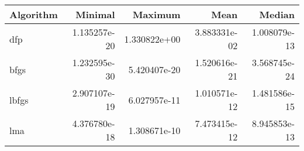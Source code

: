 \begin{tabular}{lrrrr}
\toprule
Algorithm &      Minimal &      Maximum &         Mean &       Median \\
\midrule
      dfp & 1.135257e-20 & 1.330822e+00 & 3.883331e-02 & 1.008079e-13 \\
     bfgs & 1.232595e-30 & 5.420407e-20 & 1.520616e-21 & 3.568745e-24 \\
    lbfgs & 2.907107e-19 & 6.027957e-11 & 1.010571e-12 & 1.481586e-15 \\
      lma & 4.376780e-18 & 1.308671e-10 & 7.473415e-12 & 8.945853e-13 \\
\bottomrule
\end{tabular}
